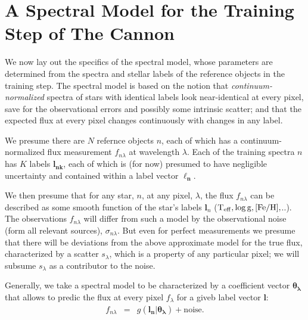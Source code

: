 \documentclass[12pt, preprint]{aastex}
\newcommand{\set}[1]{\bm{#1}}
\newcommand{\teff}{\mbox{$\rm T_{eff}$}}
\newcommand{\feh}{\mbox{$\rm [Fe/H]$}}
\newcommand{\logg}{\mbox{$\rm \log g$}}
\newcommand{\noise}{\sigma_{n\lambda}}
\newcommand{\scatter}{s_{\lambda}}
\begin{document}
\section{A Spectral Model for the Training Step of The Cannon}
\label{sec:spectralmodel}

We now lay out the specifics of the spectral model, whose parameters are determined 
from the spectra and stellar labels of the reference objects in the training step.
The spectral model is based on the notion that \textit{continuum-normalized} spectra of
stars with identical labels look near-identical at every pixel, save for the observational errors
and possibly some intrinsic scatter; and that the expected  flux at every pixel changes continuously
with changes in any label.

We presume there are $N$ refernce objects $n$, each of which has
a continuum-normalized flux measurement $f_{n\lambda}$ at wavelength
$\lambda$. Each of the training spectra $n$ has $K$ labels $\boldsymbol{l_{nk}}$, each of which
is (for now) presumed to have negligible uncertainty and contained within a label vector $\boldsymbol{\ell_n}$.

We then presume that for any star, $n$, at any pixel, $\lambda$,
the flux $f_{n\lambda}$  can be described as some smooth function of the star's labels $\set{l}_n$
($\teff,\logg,\feh,$..). The observations $f_{n\lambda}$ will differ from such a model by the observational noise (form all relevant sources), $\noise$. But even for perfect measurements we presume that there will be
deviations from the above approximate model for the true flux, characterized by a scatter $\scatter$,
which is a property of any particular pixel; we will subsume $\scatter$ as a contributor to the noise.


Generally, we take a spectral model to be characterized by a coefficient vector $\boldsymbol{\theta_\lambda}$
that allows to predic the flux at every pixel $f_\lambda$ for a giveb label vector 
$\boldsymbol{l}$:  
\begin{eqnarray}
f_{n\lambda} &=&
g(\boldsymbol{l_n} |  \boldsymbol{\theta_\lambda}) + \mbox{noise}.
 \label{eq:specmodel}
\end{eqnarray}
\end{document}
